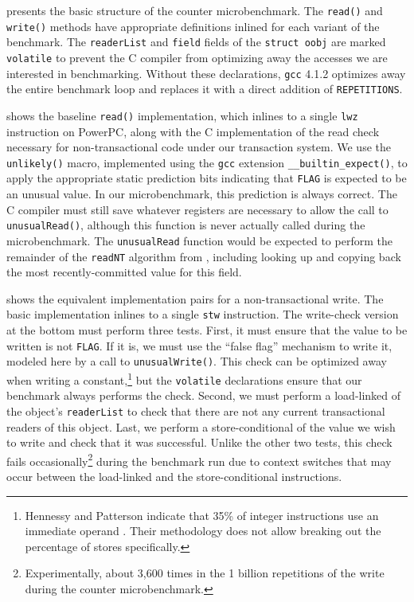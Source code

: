  presents the basic structure of the counter
microbenchmark. The \texttt{read()} and \texttt{write()} methods
have appropriate definitions inlined for each variant of the
benchmark.  The \texttt{readerList} and \texttt{field}
fields of the \texttt{struct oobj} are marked \texttt{volatile} to
prevent the C compiler from optimizing away the accesses we are
interested in benchmarking.  Without these declarations, \texttt{gcc}
4.1.2 optimizes away the entire benchmark loop and replaces it with
a direct addition of \texttt{REPETITIONS}.

 shows the baseline \texttt{read()}
implementation, which inlines to a single \texttt{lwz} instruction on
PowerPC, along with the C implementation of the read check necessary
for non-transactional code under our transaction system.  We use 
the \texttt{unlikely()} macro, implemented using the
\texttt{gcc} extension \texttt{\_\_builtin\_expect()}, to apply the
appropriate static prediction bits indicating that \texttt{FLAG} is
expected to be an unusual value.  In our microbenchmark, this
prediction is always correct.  The C compiler must still save
whatever registers are necessary to allow the call to
\texttt{unusualRead()}, although this function is never actually called
during the microbenchmark.  The \texttt{unusualRead} function would be
expected to perform the remainder of the \texttt{readNT} algorithm
from , including looking up and copying back the most
recently-committed value for this field.

 shows the equivalent implementation pairs for a
non-transactional write.  The basic implementation inlines to a single
\texttt{stw} instruction.  The write-check version at the bottom must
perform three tests.  First, it must ensure that the value to be
written is not \texttt{FLAG}.  If it is, we must use the ``false flag''
mechanism to write it, modeled here by a call to
\texttt{unusualWrite()}.  This check can be optimized away when
writing a constant,\footnote{Hennessy and Patterson indicate that 35\%
  of integer instructions use an immediate operand \cite[p. 78]{HennessyPa96}.
  Their methodology does not
  allow breaking out the percentage of stores specifically.}
 but the \texttt{volatile} declarations ensure that
our benchmark always performs the check.  Second, we must perform
a load-linked of the object's \texttt{readerList} to check that there
are not any current transactional readers of this object.  Last, we
perform a store-conditional of the value we wish to write and check
that it was successful.  Unlike the other two tests, this check
fails occasionally\footnote{Experimentally, about 3,600 times in
  the 1 billion repetitions of the write during the counter microbenchmark.}
 during the benchmark run due to context switches
that may occur between the load-linked and the store-conditional
instructions.

